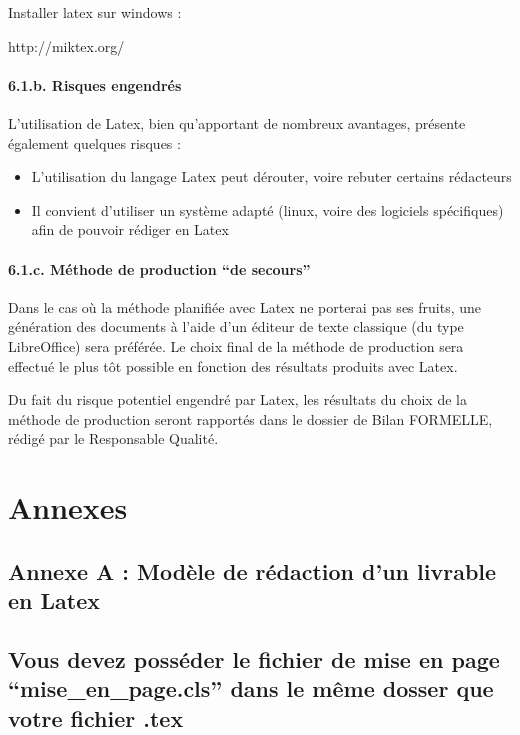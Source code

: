 \documentclass{article}
\begin{document}
\bigskip

Installer latex sur windows :

http://miktex.org/

\paragraph[6.1.b. Risques engendrés]{6.1.b. Risques engendrés}
L’utilisation de Latex, bien qu’apportant de nombreux avantages,
présente également quelques risques :

\begin{itemize}
\item L’utilisation du langage Latex peut dérouter, voire rebuter
certains rédacteurs
\item Il convient d’utiliser un système adapté (linux, voire des
logiciels spécifiques) afin de pouvoir rédiger en Latex
\end{itemize}
\paragraph[6.1.c. Méthode de production “de secours”]{6.1.c. Méthode de
production “de secours”}
Dans le cas où la méthode planifiée avec Latex ne porterai pas ses
fruits, une génération des documents à l’aide d’un éditeur de texte
classique (du type LibreOffice) sera préférée. Le choix final de la
méthode de production sera effectué le plus tôt possible en fonction
des résultats produits avec Latex.


\bigskip

Du fait du risque potentiel engendré par Latex, les résultats du choix
de la méthode de production seront rapportés dans le dossier de Bilan
FORMELLE, rédigé par le Responsable Qualité.

\section[Annexes]{Annexes}
\subsection[Annexe A : Modèle de rédaction d’un livrable en
Latex]{Annexe A : Modèle de rédaction d’un livrable en Latex}
\subsection[Vous devez posséder le fichier de mise en page
“mise\_en\_page.cls” dans le même dosser que votre fichier .tex]{Vous
devez posséder le fichier de mise en page “mise\_en\_page.cls” dans le
même dosser que votre fichier .tex}
\end{document}
